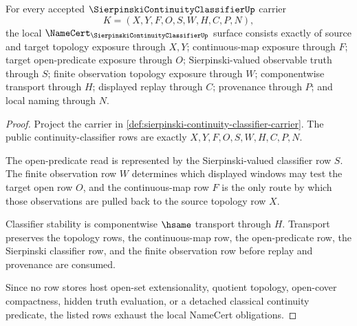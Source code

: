 \begin{theorem}
\label{thm:sierpinski-continuity-classifier-namecert-obligations}
For every accepted $\SierpinskiContinuityClassifierUp$ carrier
$$
K=(X,Y,F,O,S,W,H,C,P,N),
$$
the local $\NameCert_{\SierpinskiContinuityClassifierUp}$ surface consists exactly of source and target topology exposure through $X,Y$; continuous-map exposure through $F$; target open-predicate exposure through $O$; Sierpinski-valued observable truth through $S$; finite observation topology exposure through $W$; componentwise transport through $H$; displayed replay through $C$; provenance through $P$; and local naming through $N$.
\end{theorem}
\begin{proof}
Project the carrier in \autoref{def:sierpinski-continuity-classifier-carrier}. The public continuity-classifier rows are exactly $X,Y,F,O,S,W,H,C,P,N$.

The open-predicate read is represented by the Sierpinski-valued classifier row $S$. The finite observation row $W$ determines which displayed windows may test the target open row $O$, and the continuous-map row $F$ is the only route by which those observations are pulled back to the source topology row $X$.

Classifier stability is componentwise $\hsame$ transport through $H$. Transport preserves the topology rows, the continuous-map row, the open-predicate row, the Sierpinski classifier row, and the finite observation row before replay and provenance are consumed.

Since no row stores host open-set extensionality, quotient topology, open-cover compactness, hidden truth evaluation, or a detached classical continuity predicate, the listed rows exhaust the local NameCert obligations.
\end{proof}

